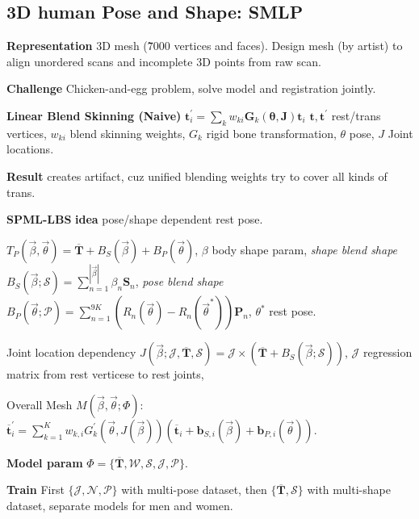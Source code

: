 \subsection*{3D human Pose and Shape: SMLP}
\textbf{Representation} 3D mesh (\~ 7000 vertices and faces). Design mesh (by artist) to align unordered scans and incomplete 3D points from raw scan.

\textbf{Challenge} Chicken-and-egg problem, solve model and registration jointly. 

\textbf{Linear Blend Skinning (Naive)} \(\mathbf{t}_{i}^{\prime}=\sum_{k} w_{k i} \mathbf{G}_{k}(\boldsymbol{\theta}, \mathbf{J}) \mathbf{t}_{i}\)  \(\mathbf{t}, \mathbf{t}^{\prime}\) rest/trans vertices, \(w_{ki}\) blend skinning weights, \(G_k\) rigid bone transformation, \(\theta\) pose, \(J\) Joint locations. 

\textbf{Result} creates artifact, cuz unified blending weights try to cover all kinds of trans.

\textbf{SPML-LBS} 
\textbf{idea}  pose/shape dependent rest pose.

\(T_{P}(\vec{\beta}, \vec{\theta})=\overline{\mathbf{T}}+B_{S}(\vec{\beta})+B_{P}(\vec{\theta})\), \(\beta\) body shape param, 
\textit{shape blend shape} \(B_{S}(\vec{\beta} ; \mathcal{S})=\sum_{n=1}^{|\vec{\beta}|} \beta_{n} \mathbf{S}_{n}\),
\textit{pose blend shape} \(B_{P}(\vec{\theta} ; \mathcal{P})=\sum_{n=1}^{9 K}(R_{n}(\vec{\theta})-R_{n}(\vec{\theta}^{*})) \mathbf{P}_{n}\), \(\theta^*\) rest pose.

Joint location dependency \(J(\vec{\beta} ; \mathcal{J}, \overline{\mathbf{T}}, \mathcal{S})=\mathcal{J}\times(\overline{\mathbf{T}}+B_{S}(\vec{\beta} ; \mathcal{S}))\), 
\(\mathcal{J}\) regression matrix from rest verticese to rest joints, 

Overall Mesh \(M(\vec{\beta}, \vec{\theta} ; \Phi)\): \(\overline{\mathbf{t}}_{i}^{\prime}=\sum_{k=1}^{K} w_{k, i} G_{k}^{\prime}(\vec{\theta}, J(\vec{\beta}))(\overline{\mathbf{t}}_{i}+\mathbf{b}_{S, i}(\vec{\beta})+\mathbf{b}_{P, i}(\vec{\theta}))\).

\textbf{Model param} \(\Phi=\{\overline{\mathbf{T}}, \mathcal{W}, \mathcal{S}, \mathcal{J}, \mathcal{P}\}\).

\textbf{Train} First \(\{\mathcal{J}, \mathcal{N}, \mathcal{P}\}\) with multi-pose dataset, then \(\{\overline{\mathbf{T}}, \mathcal{S}\}\) with multi-shape dataset, separate models for men and women.

